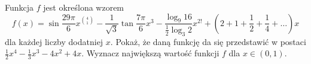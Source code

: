 Funkcja $f$ jest określona wzorem
\[
    f(x)= \sin{\frac{29\pi}{6}}x^{\binom{4}{1}}-\frac{1}{\sqrt{3}}\tan{\frac{7\pi}{6}}x^{3}-\frac{\log_{9}{16}}{\frac{1}{2}\log_{3}{2}}x^{2!}+\left(2+1+\frac{1}{2}+\frac{1}{4}+\dots \right)x
\]
dla każdej liczby dodatniej $x$. Pokaż, że daną funkcję da się przedstawić w postaci $\frac{1}{2}x^4 - \frac{1}{3}x^3 - 4x^2 + 4x$. Wyznacz największą wartość funkcji $f$ dla $x\in \left(0,1\right)$.